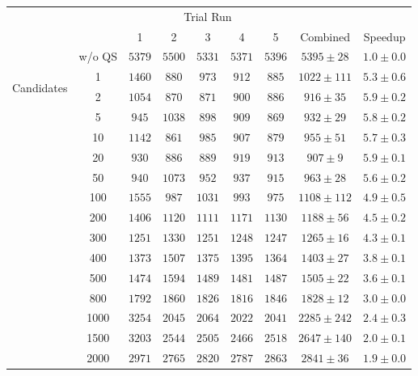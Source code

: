 \begin{table}[htbp]
	\centering
	\begin{tabular}{| c | c | c  c  c  c  c || c | c | }
		\cline{3-7} 
		\multicolumn{2}{c}{} & \multicolumn{5}{|c||}{Trial Run} \\ \cline{3-9}
		\multicolumn{2}{c|}{} & 1 & 2 & 3 & 4 & 5 & Combined & Speedup \\
		
		\cline{2-9}
		\multicolumn{1}{c|}{} 
		
		& w/o QS & $5379$ & $5500$ & $5331$ & $5371$ & $5396$ & $5395 \pm 28$ & $1.0 \pm 0.0$ \\
		
		\hline
		\multirow{14}{*}{\begin{sideways}Candidates\end{sideways}} 
		
		& 1 & $1460$ & $880$ & $973$ & $912$ & $885$ & $1022 \pm 111$ & $5.3 \pm 0.6$ \\ 
		& 2 & $1054$ & $870$ & $871$ & $900$ & $886$ & $916 \pm 35$ & $5.9 \pm 0.2$ \\ 
		& 5 & $945$ & $1038$ & $898$ & $909$ & $869$ & $932 \pm 29$ & $5.8 \pm 0.2$ \\ 
		& 10 & $1142$ & $861$ & $985$ & $907$ & $879$ & $955 \pm 51$ & $5.7 \pm 0.3$ \\ 
		& 20 & $930$ & $886$ & $889$ & $919$ & $913$ & $907 \pm 9$ & $5.9 \pm 0.1$ \\ 
		& 50 & $940$ & $1073$ & $952$ & $937$ & $915$ & $963 \pm 28$ & $5.6 \pm 0.2$ \\ 
		& 100 & $1555$ & $987$ & $1031$ & $993$ & $975$ & $1108 \pm 112$ & $4.9 \pm 0.5$ \\ 
		& 200 & $1406$ & $1120$ & $1111$ & $1171$ & $1130$ & $1188 \pm 56$ & $4.5 \pm 0.2$ \\ 
		& 300 & $1251$ & $1330$ & $1251$ & $1248$ & $1247$ & $1265 \pm 16$ & $4.3 \pm 0.1$ \\ 
		& 400 & $1373$ & $1507$ & $1375$ & $1395$ & $1364$ & $1403 \pm 27$ & $3.8 \pm 0.1$ \\ 
		& 500 & $1474$ & $1594$ & $1489$ & $1481$ & $1487$ & $1505 \pm 22$ & $3.6 \pm 0.1$ \\ 
		& 800 & $1792$ & $1860$ & $1826$ & $1816$ & $1846$ & $1828 \pm 12$ & $3.0 \pm 0.0$ \\ 
		& 1000 & $3254$ & $2045$ & $2064$ & $2022$ & $2041$ & $2285 \pm 242$ & $2.4 \pm 0.3$ \\ 
		& 1500 & $3203$ & $2544$ & $2505$ & $2466$ & $2518$ & $2647 \pm 140$ & $2.0 \pm 0.1$ \\ 
		& 2000 & $2971$ & $2765$ & $2820$ & $2787$ & $2863$ & $2841 \pm 36$ & $1.9 \pm 0.0$ \\ 
		

\end{tabular}
\end{table}
